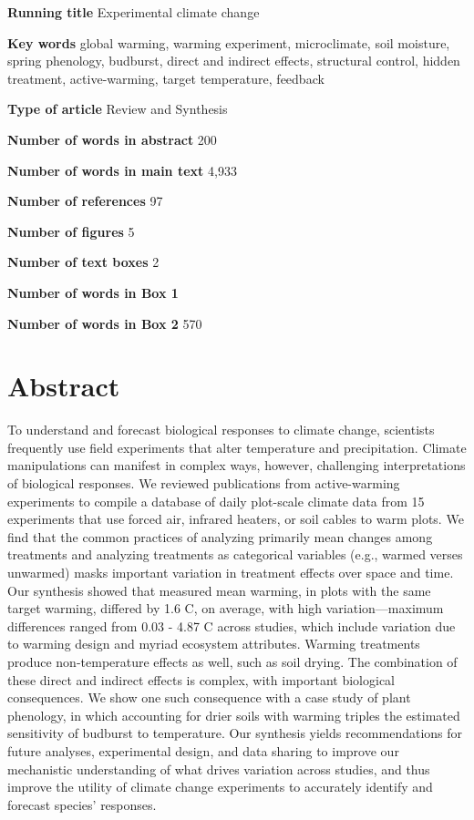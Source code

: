 \documentclass{article}
\begin{document}
\textbf{Running title} Experimental climate change

\textbf{Key words} global warming, warming experiment, microclimate, soil moisture, spring phenology, budburst, direct and indirect effects, structural control, hidden treatment, active-warming, target temperature, feedback

\textbf{Type of article} Review and Synthesis

\textbf{Number of words in abstract} 200

\textbf{Number of words in main text} 4,933%

\textbf{Number of references} 97

\textbf{Number of figures} 5


\textbf{Number of text boxes} 2

\textbf{Number of words in Box 1} 

\textbf{Number of words in Box 2} 570

\clearpage

\clearpage
\linenumbers



\section*{Abstract}
\par To understand and forecast biological responses to climate change, scientists frequently use field experiments that alter temperature and precipitation. Climate manipulations can manifest in complex ways, however, challenging interpretations of biological responses. We reviewed publications from active-warming experiments to compile a database of daily plot-scale climate data from 15 experiments that use forced air, infrared heaters, or soil cables to warm plots. We find that the common practices of analyzing primarily mean changes among treatments and analyzing treatments as categorical variables (e.g., warmed verses unwarmed) masks important variation in treatment effects over space and time. Our synthesis showed that measured mean warming, in plots with the same target warming, differed by  1.6 \degree C, on average, with high variation---maximum differences ranged from 0.03 - 4.87 \degree C across studies, which include variation due to warming design and myriad ecosystem attributes. Warming treatments produce non-temperature effects as well, such as soil drying. The combination of these direct and indirect effects is complex, with important biological consequences. We show one such consequence with a case study of plant phenology, in which accounting for drier soils with warming triples the estimated sensitivity of budburst to temperature. Our synthesis yields recommendations for future analyses, experimental design, and data sharing to improve our mechanistic understanding of what drives variation across studies, and thus improve the utility of climate change experiments to accurately identify and forecast species' responses.
\end{document}
